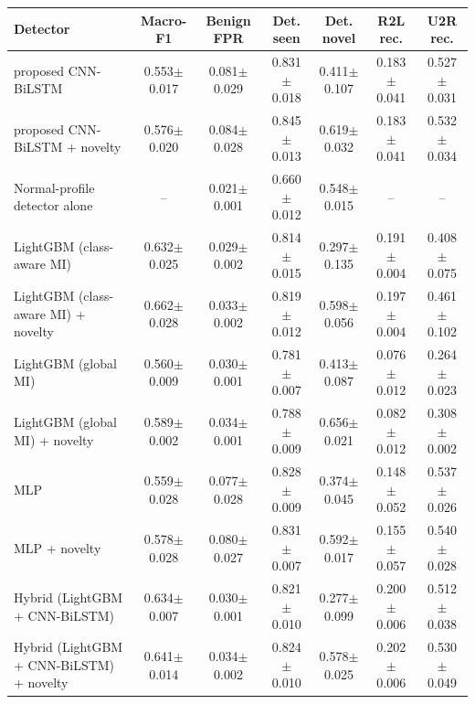 \begin{tabular}{lcccccc}
\toprule
Detector & Macro-F1 & Benign FPR & Det. seen & Det. novel & R2L rec. & U2R rec. \\
\midrule
proposed CNN-BiLSTM & 0.553$\pm$0.017 & 0.081$\pm$0.029 & 0.831$\pm$0.018 & 0.411$\pm$0.107 & 0.183$\pm$0.041 & 0.527$\pm$0.031 \\
proposed CNN-BiLSTM + novelty & 0.576$\pm$0.020 & 0.084$\pm$0.028 & 0.845$\pm$0.013 & 0.619$\pm$0.032 & 0.183$\pm$0.041 & 0.532$\pm$0.034 \\
Normal-profile detector alone & -- & 0.021$\pm$0.001 & 0.660$\pm$0.012 & 0.548$\pm$0.015 & -- & -- \\
LightGBM (class-aware MI) & 0.632$\pm$0.025 & 0.029$\pm$0.002 & 0.814$\pm$0.015 & 0.297$\pm$0.135 & 0.191$\pm$0.004 & 0.408$\pm$0.075 \\
LightGBM (class-aware MI) + novelty & 0.662$\pm$0.028 & 0.033$\pm$0.002 & 0.819$\pm$0.012 & 0.598$\pm$0.056 & 0.197$\pm$0.004 & 0.461$\pm$0.102 \\
LightGBM (global MI) & 0.560$\pm$0.009 & 0.030$\pm$0.001 & 0.781$\pm$0.007 & 0.413$\pm$0.087 & 0.076$\pm$0.012 & 0.264$\pm$0.023 \\
LightGBM (global MI) + novelty & 0.589$\pm$0.002 & 0.034$\pm$0.001 & 0.788$\pm$0.009 & 0.656$\pm$0.021 & 0.082$\pm$0.012 & 0.308$\pm$0.002 \\
MLP & 0.559$\pm$0.028 & 0.077$\pm$0.028 & 0.828$\pm$0.009 & 0.374$\pm$0.045 & 0.148$\pm$0.052 & 0.537$\pm$0.026 \\
MLP + novelty & 0.578$\pm$0.028 & 0.080$\pm$0.027 & 0.831$\pm$0.007 & 0.592$\pm$0.017 & 0.155$\pm$0.057 & 0.540$\pm$0.028 \\
Hybrid (LightGBM + CNN-BiLSTM) & 0.634$\pm$0.007 & 0.030$\pm$0.001 & 0.821$\pm$0.010 & 0.277$\pm$0.099 & 0.200$\pm$0.006 & 0.512$\pm$0.038 \\
Hybrid (LightGBM + CNN-BiLSTM) + novelty & 0.641$\pm$0.014 & 0.034$\pm$0.002 & 0.824$\pm$0.010 & 0.578$\pm$0.025 & 0.202$\pm$0.006 & 0.530$\pm$0.049 \\
\bottomrule
\end{tabular}

